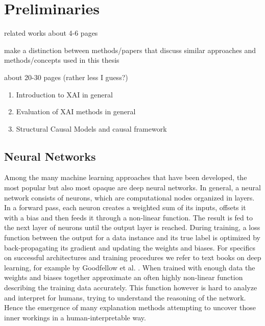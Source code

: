 \chapter{Preliminaries}\label{chapter:background}


{\color{red} related works
      about 4-6 pages

      make a distinction between methods/papers that discuss similar approaches and methods/concepts used in this thesis}

{ \color{red}

    about 20-30 pages (rather less I guess?)

    \begin{enumerate}
        \item Introduction to XAI in general
        \item Evaluation of XAI methods in general
        \item Structural Causal Models and causal framework
    \end{enumerate}
}

\section{Neural Networks}
Among the many machine learning approaches that have been developed, the most popular but also most opaque are deep neural networks. In general, a neural network consists of neurons, which are computational nodes organized in layers. In a forward pass, each neuron creates a weighted sum of its inputs, offsets it with a bias and then feeds it through a non-linear function. The result is fed to the next layer of neurons until the output layer is reached. During training, a loss function between the output for a data instance and its true label is optimized by back-propagating its gradient and updating the weights and biases. For specifics on successful architectures and training procedures we refer to text books on deep learning, for example by Goodfellow et al. \cite{Goodfellow2016}. When trained with enough data the weights and biases together approximate an often highly non-linear function describing the training data accurately. This function however is hard to analyze and interpret for humans, trying to understand the reasoning of the network. Hence the emergence of many explanation methods attempting to uncover those inner workings in a human-interpretable way.


